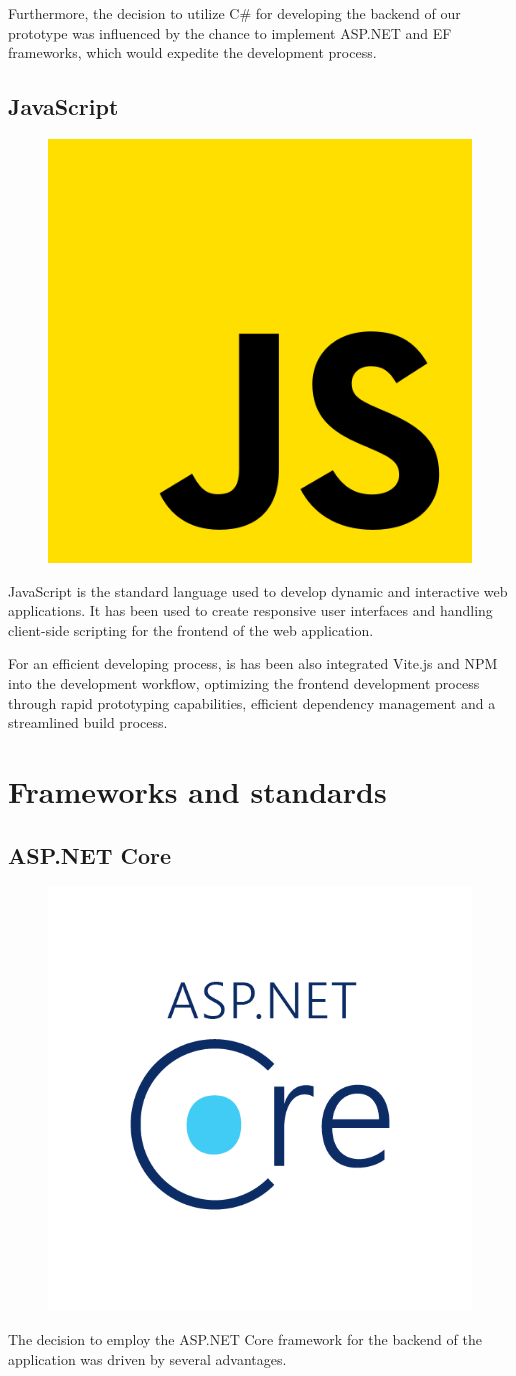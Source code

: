 Furthermore, the decision to utilize C\# for developing the backend of our prototype was influenced by the chance to implement ASP.NET and EF frameworks, which would expedite the development process.

\subsection{JavaScript}

\begin{figure}[H]
    \hfill
    \includegraphics[width=0.1\linewidth]{../assets/tools-logos/js.png}
    \hspace{1cm}
\end{figure}

JavaScript is the standard language used to develop dynamic and interactive web applications.
It has been used to create responsive user interfaces and handling client-side scripting for the frontend of the web application.

For an efficient developing process, is has been also integrated Vite.js and NPM into the development workflow, optimizing the frontend development process through rapid prototyping capabilities, efficient dependency management and a streamlined build process.

\section{Frameworks and standards}

\subsection{ASP.NET Core}

\begin{figure}[H]
    \hfill
    \includegraphics[width=0.1\linewidth]{../assets/tools-logos/asp-net-core.png}
    \hspace{1cm}
\end{figure}

The decision to employ the ASP.NET Core framework for the backend of the application was driven by several advantages.

